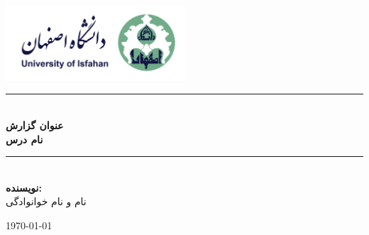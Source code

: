 \begin{titlepage}
	\setlength{\arrayrulewidth}{0.4mm}
	\newcommand{\HRule}{\rule{\linewidth}{0.5mm}}
	\begin{center}
		\includegraphics[width=0.5\textwidth]{./Fig/logo.png}~\\[4cm]
		
		\HRule \\[0.4cm]
		{
			\Huge\textbf{عنوان گزارش} \\
			[0.4cm]
			
			\large \bfseries
			نام درس \\ 
			[0.4cm]}
		\HRule \\[4cm]
		
		\large\textbf{نویسنده: }\\[0.2cm]
		نام و نام خوانوادگی 
		\\[3cm]
		
		\vfill
		
		{\large \today}
		
	\end{center}
\end{titlepage}